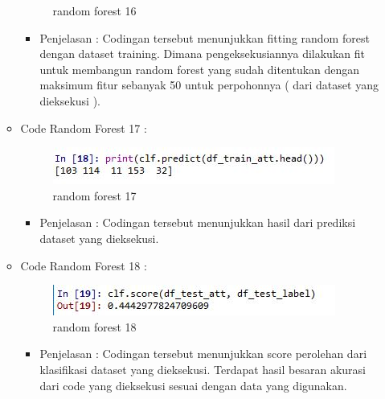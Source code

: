 \begin{enumerate}
\begin{itemize}
\begin{figure}[ht]
\caption{random forest 16}
\label{contoh}
\end{figure}
\par
\begin{itemize}
\item Penjelasan : Codingan tersebut menunjukkan fitting random forest dengan dataset training. Dimana pengeksekusiannya dilakukan fit untuk membangun random forest yang sudah ditentukan dengan maksimum fitur sebanyak 50 untuk perpohonnya ( dari dataset yang dieksekusi ).
\par
\par
\end{itemize}
\item Code Random Forest 17 :
\par
\begin{figure}[ht]
\centering
\includegraphics[scale=0.2]{figures/ran17.jpg}
\caption{random forest 17}
\label{contoh}
\end{figure}
\par
\begin{itemize}
\item Penjelasan : Codingan tersebut menunjukkan hasil dari prediksi dataset yang dieksekusi. 
\par
\par
\end{itemize}
\item Code Random Forest 18 :
\par
\begin{figure}[ht]
\centering
\includegraphics[scale=0.2]{figures/ran18.jpg}
\caption{random forest 18}
\label{contoh}
\end{figure}
\par
\begin{itemize}
\item Penjelasan : Codingan tersebut menunjukkan score perolehan dari klasifikasi dataset yang dieksekusi. Terdapat hasil besaran akurasi dari code yang dieksekusi sesuai dengan data yang digunakan.
\par
\par
\end{itemize}
\end{itemize}





\end{enumerate}

